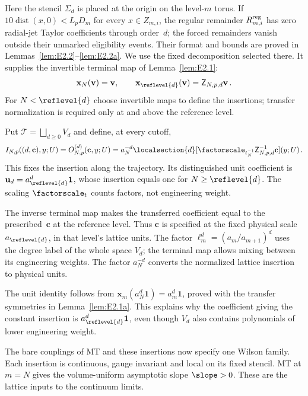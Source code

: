 Here the stencil $\Sigma_d$ is placed at the origin on the level-$m$ torus. If $10\operatorname{dist}(x,0)<L_pD_m$ for every $x\in Z_{m,i}$, the regular remainder $R_{m,i}^{\rm reg}$ has zero radial-jet Taylor coefficients through order~$d$; the forced remainders vanish outside their unmarked eligibility events. Their format and bounds are proved in Lemmas~\ref{lem:E2.2}--\ref{lem:E2.2a}. We use the fixed decomposition selected there. It supplies the invertible terminal map of Lemma~\ref{lem:E2.1}:
\begin{equation*}
\mathbf x_N(\mathbf v)=\mathbf v,\qquad
\mathbf x_{\reflevel{d}}(\mathbf v)=\mathsf Z_{N,p,d}\mathbf v\,.
\end{equation*}
For $N<\reflevel{d}$ choose invertible maps to define the insertions; transfer normalization is required only at and above the reference level.

\begin{definition}\label{def:D08}
Put $\mathcal T=\bigsqcup_{d\ge0}V_d$ and define, at every cutoff,
\begin{equation*}
I_{N,p}((d,\mathbf c),y;U)=O^{(d)}_{N,p}(\mathbf c,y;U)
=a_N^{-d}\localsection{d}[\factorscale_{t_N^{-1}}\mathsf Z_{N,p,d}^{-1}\mathbf c](y;U)\,.
\end{equation*}
This fixes the insertion along the trajectory. Its distinguished unit coefficient is $\mathbf u_d=a_{\reflevel{d}}^d\mathbf1$, whose insertion equals one for $N\ge\reflevel{d}$. The scaling $\factorscale_t$ counts factors, not engineering weight.
\end{definition}

The inverse terminal map makes the transferred coefficient equal to the prescribed~$\mathbf c$ at the reference level. Thus $\mathbf c$ is specified at the fixed physical scale $a_{\reflevel{d}}$, in that level's lattice units. The factor $\ell_m^d=(a_m/a_{m+1})^d$ uses the degree label of the whole space $V_d$; the terminal map allows mixing between its engineering weights. The factor $a_N^{-d}$ converts the normalized lattice insertion to physical units.

The unit identity follows from $\mathbf x_m(a_N^d\mathbf1)=a_m^d\mathbf1$, proved with the transfer symmetries in Lemma~\ref{lem:E2.1a}. This explains why the coefficient giving the constant insertion is $a_{\reflevel{d}}^d\mathbf1$, even though $V_d$ also contains polynomials of lower engineering weight.

The bare couplings of MT and these insertions now specify one Wilson family. Each insertion is continuous, gauge invariant and local on its fixed stencil. MT at $m=N$ gives the volume-uniform asymptotic slope $\slope>0$. These are the lattice inputs to the continuum limits.
